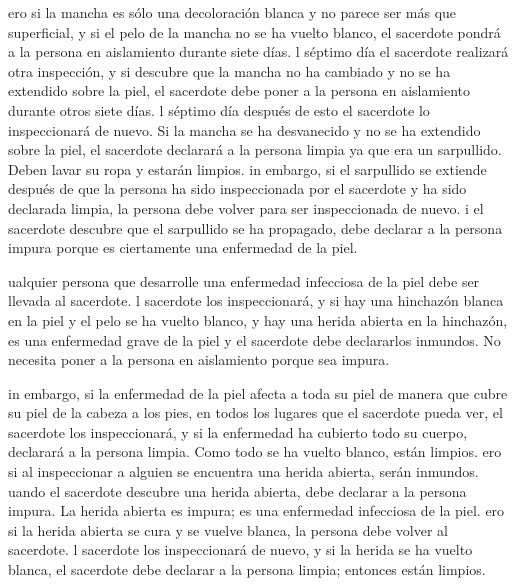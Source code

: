  ero si la mancha es sólo una decoloración blanca y no
parece ser más que superficial, y si el pelo de la mancha no se ha
vuelto blanco, el sacerdote pondrá a la persona en aislamiento durante
siete días.  l séptimo día el sacerdote realizará otra
inspección, y si descubre que la mancha no ha cambiado y no se ha
extendido sobre la piel, el sacerdote debe poner a la persona en
aislamiento durante otros siete días.  l séptimo día después
de esto el sacerdote lo inspeccionará de nuevo. Si la mancha se ha
desvanecido y no se ha extendido sobre la piel, el sacerdote declarará a
la persona limpia ya que era un sarpullido. Deben lavar su ropa y
estarán limpios.  in embargo, si el sarpullido se extiende
después de que la persona ha sido inspeccionada por el sacerdote y ha
sido declarada limpia, la persona debe volver para ser inspeccionada de
nuevo.  i el sacerdote descubre que el sarpullido se ha
propagado, debe declarar a la persona impura porque es ciertamente una
enfermedad de la piel.

 ualquier persona que desarrolle una enfermedad infecciosa
de la piel debe ser llevada al sacerdote.  l sacerdote los
inspeccionará, y si hay una hinchazón blanca en la piel y el pelo se ha
vuelto blanco, y hay una herida abierta en la hinchazón, 
es una enfermedad grave de la piel y el sacerdote debe declararlos
inmundos. No necesita poner a la persona en aislamiento porque sea
impura.

 in embargo, si la enfermedad de la piel afecta a toda su
piel de manera que cubre su piel de la cabeza a los pies, en todos los
lugares que el sacerdote pueda ver,  el sacerdote los
inspeccionará, y si la enfermedad ha cubierto todo su cuerpo, declarará
a la persona limpia. Como todo se ha vuelto blanco, están limpios.
 ero si al inspeccionar a alguien se encuentra una herida
abierta, serán inmundos.  uando el sacerdote descubre una
herida abierta, debe declarar a la persona impura. La herida abierta es
impura; es una enfermedad infecciosa de la piel.  ero si la
herida abierta se cura y se vuelve blanca, la persona debe volver al
sacerdote.  l sacerdote los inspeccionará de nuevo, y si la
herida se ha vuelto blanca, el sacerdote debe declarar a la persona
limpia; entonces están limpios.

